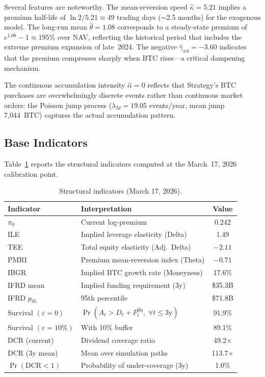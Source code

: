 Several features are noteworthy.  The mean-reversion speed $\hat\kappa = 5.21$
implies a premium half-life of $\ln 2 / 5.21 \approx 49$ trading days
($\sim$2.5 months) for the exogenous model.  The long-run mean
$\hat\theta = 1.08$ corresponds to a steady-state premium of
$e^{1.08} - 1 \approx 195\%$ over NAV, reflecting the historical period
that includes the extreme premium expansion of late~2024.  The negative
$\hat\gamma_{\pi S} = -3.60$ indicates that the premium compresses sharply
when BTC rises---a critical dampening mechanism.

The continuous accumulation intensity $\hat\alpha = 0$ reflects that
Strategy's BTC purchases are overwhelmingly discrete events rather than
continuous market orders: the Poisson jump process ($\lambda_M = 19.05$
events/year, mean jump 7,044~BTC) captures the actual accumulation
pattern.

\subsection{Base Indicators}\label{sec:base_indicators}

Table~\ref{tab:indicators} reports the structural indicators computed at
the March~17, 2026 calibration point.

\begin{table}[H]
\centering
\caption{Structural indicators (March 17, 2026).}
\label{tab:indicators}
\begin{tabular}{@{}llc@{}}
\toprule
\textbf{Indicator} & \textbf{Interpretation} & \textbf{Value} \\
\midrule
$\pi_0$ & Current log-premium & 0.242 \\
ILE & Implied leverage elasticity (Delta) & 1.49 \\
TEE & Total equity elasticity (Adj.\ Delta) & $-2.11$ \\
PMRI & Premium mean-reversion index (Theta) & $-0.71$ \\
IBGR & Implied BTC growth rate (Moneyness) & 17.6\% \\
\midrule
IFRD mean & Implied funding requirement (3y) & \$35.3B \\
IFRD $p_{95}$ & 95th percentile & \$71.8B \\
\midrule
Survival $(\varepsilon=0)$ & $\Pr(A_t > D_t + P_t^{\mathrm{liq}},\;\forall t \le 3\text{y})$ & 91.9\% \\
Survival $(\varepsilon=10\%)$ & With 10\% buffer & 89.1\% \\
\midrule
DCR (current) & Dividend coverage ratio & 49.2$\times$ \\
DCR (3y mean) & Mean over simulation paths & 113.7$\times$ \\
$\Pr(\text{DCR} < 1)$ & Probability of under-coverage (3y) & 1.0\% \\
\bottomrule
\end{tabular}
\end{table}

